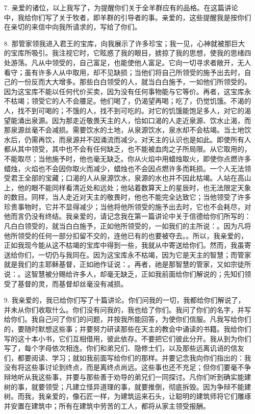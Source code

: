 7. 亲爱的诸位，以上我写了，为提醒你们关于全羊群应有的品格。在这篇讲论中，我给你们写了关于牧者，即羊群的引导者的事。亲爱的，这些提醒我是按你们在亲切的来信中向我所请求的，写给了你们。\par

8. 那管家领我进入君王的宝库，向我展示了许多珍宝；我一见，心神就被那巨大的宝库所吸引。我注视它时，它眩惑了我的眼目，掳掠了我的思想，使我的思绪四处游荡。凡从中领受的，自己富足，也能使他人富足。它向一切寻求者敞开，无人看守；虽有许多人从中取用，却不见缺损；当他们将自己所领受的施予出去时，自己的一份反而大大增多。那些白白领受的人，就当白白施予，一如他们所领受的。因为这宝库不能以任何代价买卖，因为没有任何事物能与它等价。再者，这宝库永不枯竭；领受它的人不会餍足。他们喝了，仍渴望再喝；吃了，仍觉饥饿。不渴的人，找不到可喝的；不饿的人，找不到可吃的。对它的饥饿能饱足多人，对它的渴望能涌出泉源。因为那走近敬畏天主的人，恰如口渴的人走近泉源、饮水止渴，而那泉源丝毫不会减损。需要饮水的土地，从泉源饮水，泉水却不会枯竭。当土地饮水后，仍需再饮，而泉源并不因涌流而减少。对天主的认识也是如此。即使所有人都从其中领受，其中也不会有任何缺乏，也不能被血肉之子所局限。从它取用的，不能取尽；当他施予时，他也毫无缺乏。你从火焰中用蜡烛取火，即使你点燃许多蜡烛，火焰也不会因你取火而减少，蜡烛也不会因点燃许多而耗损。一个人无法领受君王全部的宝藏；口渴的人从泉源饮水，泉源的水也并不因此枯竭。人站在高山上，他的眼不能同样看清近处和远处；他站着数算天上的星辰时，也无法限定天象的数目。同样，当人走近对天主的敬畏时，他也不能完全达致它；当他领受了许多珍贵事物时，它并不显得减少；当他将他所领受的施予出去时，它也不会耗尽，对他而言仍没有终结。我亲爱的，请记念我在第一篇讲论中关于信德给你们所写的：凡白白领受的，就当白白施予，正如他所领受的，一如我们的主所说：。因为凡将他所领受的任何一部分扣留不交的，连他已有的也要被夺去。。所以，我亲爱的，正如我现今能从这不枯竭的宝库中得到一些，我就从中寄送给你们。然而，我虽寄送给你们，一切仍与我同在。因为这宝库永不枯竭，因为它是天主的智慧；而管家就是我们的主耶稣基督，正如祂作证说：。再者，祂是那智慧的管家，又如宗徒所说：。这智慧被分赐给许多人，却毫无缺乏，正如我前面给你们解说的；先知们领受了基督的灵，而基督却丝毫没有减损。\par

9. 我亲爱的，我已给你们写了十篇讲论。你们问我的一切，我都给你们解说了，并未从你们收取什么。你们没有问我的，我也给了你们。我问了你们的名字，并写给你们。我自己问了你们的问题，并按我所能回答，为使你们信服。凡我写给你们的，要随时默想这些事；并要努力研读那些在天主的教会中诵读的书籍。我给你们写的这十本小书，它们互相借用，彼此依存。不要把它们彼此分开。我从到为你们写了，每个字母依次相连。你们和弟兄们、隐修士们，以及那些远离讥诮的信友们，都要阅读、学习；就如我前面写给你们的那样。并要记念我向你们指出的：我没有将这些事讨论到终点，而是离终点尚远。这些事也还不充足；但你们要毫不争辩地听从我这些事，并要与那些善于劝导的弟兄们一同探讨。凡你们听到确实能建树的事，就要领受；凡建立怪异道理的事，就要推倒，彻底拆毁。因为争辩不能建树。而我，我亲爱的，像石匠一样，为建筑运来石头，让聪明的建筑师将它们雕琢并安置在建筑中；所有在建筑中劳苦的工人，都将从家主领受报酬。\par

